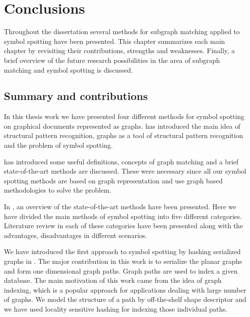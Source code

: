 \chapter{Conclusions} %
\label{chap:conclusions}
Throughout the dissertation several methods for subgraph matching applied to symbol spotting have been presented. This chapter summarizes each main chapter by revisiting their contributions, strengths and weaknesses. Finally, a brief overview of the future research possibilities in the area of subgraph matching and symbol spotting is discussed.
\section{Summary and contributions}



In this thesis work we have presented four different methods for symbol spotting on graphical documents represented as graphs.  has introduced the main idea of structural pattern recognition, graphs as a tool of structural pattern recognition and the problem of symbol spotting.

 has introduced some useful definitions, concepts of graph matching and a brief state-of-the-art methods are discussed. These were necessary since all our symbol spotting methods are based on graph representation and use graph based methodologies to solve the problem.

In , an overview of the state-of-the-art methods have been presented. Here we have divided the main methods of symbol spotting into five different categories. Literature review in each of these categories have been presented along with the advantages, disadvantages in different scenarios.

We have introduced the first approach to symbol spotting by hashing serialized graphs in . The major contribution in this work is to serialize the planar graphs and form one dimensional graph paths. Graph paths are used to index a given database. The main motivation of this work came from the idea of graph indexing, which is a popular approach for applications dealing with large number of graphs. We model the structure of a path by off-the-shelf shape descriptor and we have used locality sensitive hashing for indexing those individual paths.

